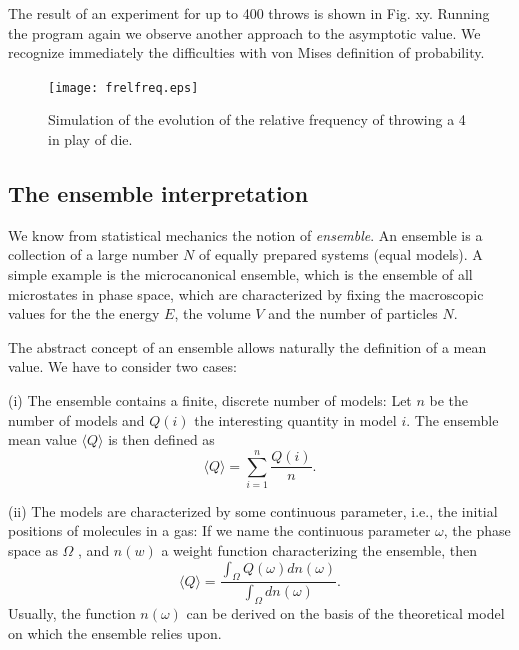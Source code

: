 The result of an experiment for up to 400 throws is shown in Fig. 
xy. Running the program again we observe another approach to the asymptotic
value. We recognize immediately the difficulties with von Mises 
definition of probability.
\begin{figure}
\texttt{[image: frelfreq.eps]}
\caption{Simulation of the evolution of the relative frequency of throwing
a 4 in play of die.}
\end{figure}

\subsection{The ensemble interpretation}
We know from statistical mechanics  the notion of {\em ensemble}. An
ensemble is a collection of a large number $N$ of equally prepared
systems (equal models). A simple example is the microcanonical
ensemble, 
which is the
ensemble of all microstates in phase space, which are characterized by
fixing the macroscopic values for the the energy $E$, the volume $V$
and the number of particles $N$.

The abstract concept of an ensemble allows naturally the definition
of a mean value. We have to consider two cases:

(i) The ensemble contains a finite, discrete number of models: 
Let $n$ be the number of models and $Q(i)$ the interesting quantity in
model $i$. The ensemble mean value $\langle Q \rangle$ is then defined
as
\begin{equation}
\langle Q \rangle = \sum_{i=1}^n \frac{Q(i)}{n}.
\end{equation}

(ii) The models are characterized by some continuous parameter, i.e.,
the initial positions of molecules in a gas: If we name the continuous
parameter $\omega$, the phase space as $\Omega$ , and $n(w)$ a weight
function characterizing the ensemble, then
\begin{equation}
\langle Q \rangle = \frac{ \int_{\Omega} Q(\omega) dn(\omega)}
                         {\int_{\Omega} dn(\omega)}.
\end{equation}
Usually, the function $n(\omega)$ can be derived on the basis of the
theoretical model on which the ensemble relies upon. 

